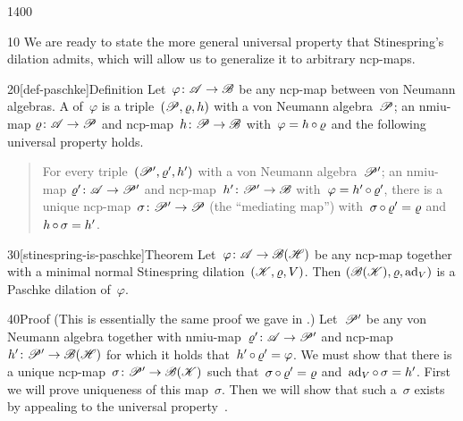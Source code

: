 \begin{parsec}{1400}%
\begin{point}{10}%
    We are ready to state the more general universal property
        that Stinespring's dilation admits,
        which will allow us to generalize it to arbitrary ncp-maps.
\end{point}
%
%
\spacingfix{}
\begin{point}{20}[def-paschke]{Definition}%
    Let~$\varphi\colon \mathscr{A} \to \mathscr{B}$
        be any ncp-map between von Neumann algebras.
    A  of~$\varphi$
    is a triple~$(\mathscr{P}, \varrho, h)$
    with a von Neumann algebra~$\mathscr{P}$;
    an nmiu-map $\varrho \colon \mathscr{A} \to \mathscr{P}$
    and ncp-map~$h \colon \mathscr{P} \to \mathscr{B}$
    with~$\varphi = h \mathop{\circ} \varrho$
    and the following universal property holds.
\begin{quote}
    For every triple~$(\mathscr{P}', \varrho', h')$
    with a von Neumann algebra~$\mathscr{P}'$;
    an nmiu-map $\varrho'\colon \mathscr{A} \to \mathscr{P}'$
    and ncp-map~$h' \colon \mathscr{P}' \to \mathscr{B}$
    with~$\varphi = h' \mathop{\circ} \varrho'$,
    there is a unique ncp-map~$\sigma \colon \mathscr{P}' \to \mathscr{P}$
    (the ``mediating map'')
    with~$\sigma \mathop{\circ} \varrho' = \varrho$
    and~$h \mathop{\circ} \sigma = h'$.
\end{quote}

\par %
\end{point}
\spacingfix{}
\begin{point}{30}[stinespring-is-paschke]{Theorem}%
Let~$\varphi\colon \mathscr{A} \to \mathscr{B}(\mathscr{H})$
    be any ncp-map
    together with a minimal normal Stinespring dilation~$(\mathscr{K},\varrho,V)$.
    Then $(\mathscr{B}(\mathscr{K}), \varrho, \mathrm{ad}_V)$
        is a Paschke dilation of~$\varphi$.
\begin{point}{40}{Proof}%
(This is essentially the same proof
    we gave in \cite{wwpaschke}.)
%
\noindent Let~$\mathscr{P}'$ be any von Neumann algebra
    together with nmiu-map~$\varrho'\colon \mathscr{A} \to \mathscr{P}'$
    and ncp-map~$h'\colon \mathscr{P}' \to \mathscr{B}(\mathscr{H})$
    for which it holds that~$h' \mathop{\circ} \varrho' = \varphi$.
We must show that there is a unique
    ncp-map~$\sigma\colon \mathscr{P}' \to \mathscr{B}(\mathscr{K})$
    such that~$\sigma \mathop{\circ} \varrho' = \varrho$
    and~$\mathrm{ad}_V \mathop{\circ} \sigma = h'$.
First we will prove uniqueness of this map~$\sigma$.
Then we will show that such a~$\sigma$ exists
    by appealing to the universal property~.


\end{point}
\end{point}
\end{parsec}
